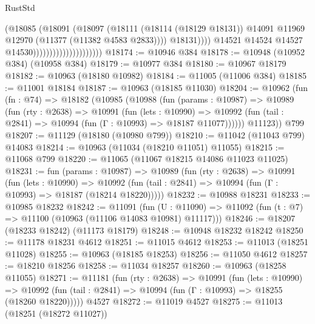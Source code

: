 \begin{lexlean}{RustStd}
\begin{coremodule}
                                                  (@18085
                                                    (@18091
                                                      (@18097
                                                        (@18111
                                                          (@18114 (@18129 @18131))
                                                          @14091
                                                          @11969
                                                          @12970
                                                          (@11377 (@11382 @4583 @2833))))
                                                      @18131))))
                                              @14521
                                              @14524
                                              @14527
                                              @14530)))))))))))))))))))))
@18174 := @10946 @384
@18178 := @10948 (@10952 @384) (@10958 @384)
@18179 := @10977 @384
@18180 := @10967 @18179
@18182 := @10963 (@18180 @10982)
@18184 := @11005 (@11006 @384)
@18185 := @11001 @18184
@18187 := @10963 (@18185 @11030)
@18204 := @10962
    (fun (fn : @74) =>
    @18182
      (@10985
        (@10988
          (fun (params : @10987) =>
          @10989
            (fun (rty : @2638) =>
            @10991
              (fun (lets : @10990) =>
              @10992 (fun (tail : @2841) => @10994 (fun (Γ : @10993) => @18187 @11077))))))
        @11123))
    @799
@18207 := @11129 (@18180 (@10980 @799))
@18210 := @11042 (@11043 @799) @14083
@18214 := @10963 (@11034 (@18210 @11051) @11055)
@18215 := @11068 @799
@18220 := @11065 (@11067 @18215 @14086 @11023 @11025)
@18231 := fun (params : @10987) =>
  @10989
    (fun (rty : @2638) =>
    @10991
      (fun (lets : @10990) =>
      @10992 (fun (tail : @2841) => @10994 (fun (Γ : @10993) => @18187 (@18214 @18220)))))
@18232 := @10988 @18231
@18233 := @10985 @18232
@18242 := @11091
    (fun (U : @11090) => @11092 (fun (t : @7) => @11100 (@10963 (@11106 @14083 @10981) @11117)))
@18246 := @18207 (@18233 @18242) (@11173 @18179)
@18248 := @10948 @18232 @18242
@18250 := @11178 @18231 @4612
@18251 := @11015 @4612
@18253 := @11013 (@18251 @11028)
@18255 := @10963 (@18185 @18253)
@18256 := @11050 @4612
@18257 := @18210 @18256
@18258 := @11034 @18257
@18260 := @10963 (@18258 @11055)
@18271 := @11181
    (fun (rty : @2638) =>
    @10991
      (fun (lets : @10990) =>
      @10992 (fun (tail : @2841) => @10994 (fun (Γ : @10993) => @18255 (@18260 @18220)))))
    @4527
@18272 := @11019 @4527
@18275 := @11013 (@18251 (@18272 @11027))

\end{coremodule}
\end{lexlean}
